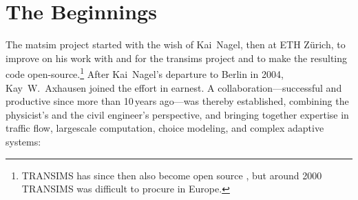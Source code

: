 \section{The Beginnings}
\label{sec:howitstarted}
The \gls{matsim} project \citep[][]{MATSIM_Webpage_2015} started with the wish of Kai~Nagel, then at ETH Zürich, to improve on his work with and for the \gls{transims} project \citep[][]{SmithEtc1995TRANSIMSSeattle,TRANSIMSFHWA_Webpage_2013} and to make the resulting code open-source.\footnote{%
%
TRANSIMS has since then also become open source \citep{TRANSIMSOS_Webpage_2013}, but around 2000 TRANSIMS was difficult to procure in Europe.
%
} After Kai~Nagel's departure to Berlin in 2004, Kay~W.~Axhausen joined the effort in earnest. A collaboration---successful and productive since more than 10\,years ago---was thereby established, combining the physicist's and the civil engineer's perspective, and bringing together expertise in
%
traffic flow,
%
\gls{largescale} computation,
%
choice modeling,
%
and
%
complex adaptive systems:
%
%
%
%
%
%
%
